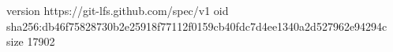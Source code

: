 version https://git-lfs.github.com/spec/v1
oid sha256:db46f75828730b2e25918f77112f0159cb40fdc7d4ee1340a2d527962e94294c
size 17902
